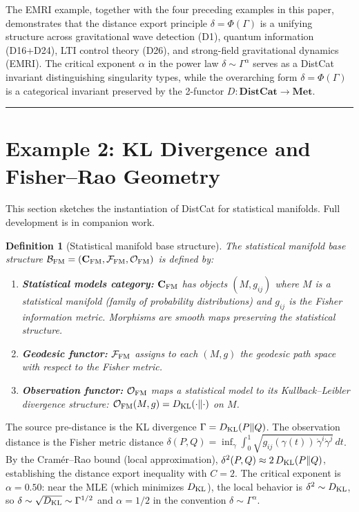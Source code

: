 \documentclass[
]{article}
\newtheorem{definition}[theorem]{Definition}
\begin{document}
The EMRI example, together with the four preceding examples in this paper, demonstrates that the distance export principle $\delta = \Phi(\Gamma)$ is a unifying structure across gravitational wave detection (D1), quantum information (D16+D24), LTI control theory (D26), and strong-field gravitational dynamics (EMRI). The critical exponent $\alpha$ in the power law $\delta \sim \Gamma^\alpha$ serves as a DistCat invariant distinguishing singularity types, while the overarching form $\delta = \Phi(\Gamma)$ is a categorical invariant preserved by the 2-functor $D: \mathbf{DistCat} \to \mathbf{Met}$.

\begin{center}\rule{0.5\linewidth}{0.5pt}\end{center}


\section{Example 2: KL Divergence and Fisher--Rao Geometry}\label{sec:example2-fisher-rao}

This section sketches the instantiation of DistCat for statistical manifolds. Full development is in companion work.

\begin{definition}[Statistical manifold base structure]\label{def:stat-manifold}
The statistical manifold base structure $\mathcal{B}_{\rm FM} = (\mathbf{C}_{\rm FM}, \mathcal{F}_{\rm FM}, \mathcal{O}_{\rm FM})$ is defined by:
\begin{enumerate}
\item \textbf{Statistical models category:} $\mathbf{C}_{\rm FM}$ has objects $(M, g_{ij})$ where $M$ is a statistical manifold (family of probability distributions) and $g_{ij}$ is the Fisher information metric. Morphisms are smooth maps preserving the statistical structure.
\item \textbf{Geodesic functor:} $\mathcal{F}_{\rm FM}$ assigns to each $(M, g)$ the geodesic path space with respect to the Fisher metric.
\item \textbf{Observation functor:} $\mathcal{O}_{\rm FM}$ maps a statistical model to its Kullback--Leibler divergence structure: $\mathcal{O}_{\rm FM}(M, g) = D_{\rm KL}(\cdot \| \cdot)$ on $M$.
\end{enumerate}
\end{definition}

The source pre-distance is the KL divergence $\Gamma = D_{\rm KL}(P \| Q)$. The observation distance is the Fisher metric distance $\delta(P, Q) = \inf_{\gamma} \int_0^1 \sqrt{g_{ij}(\gamma(t))\, \dot{\gamma}^i \dot{\gamma}^j}\, dt$. By the Cram\'er--Rao bound (local approximation), $\delta^2(P, Q) \approx 2\, D_{\rm KL}(P \| Q)$, establishing the distance export inequality with $C = 2$. The critical exponent is $\alpha = 0.50$: near the MLE (which minimizes $D_{\rm KL}$), the local behavior is $\delta^2 \sim D_{\rm KL}$, so $\delta \sim \sqrt{D_{\rm KL}} \sim \Gamma^{1/2}$ and $\alpha = 1/2$ in the convention $\delta \sim \Gamma^\alpha$.
\end{document}
